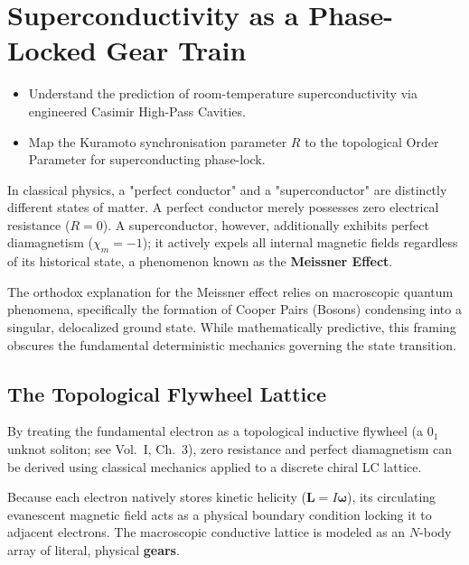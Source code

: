 \section{Superconductivity as a Phase-Locked Gear Train}


\begin{objectivebox}
\begin{itemize}
    \item Understand the prediction of room-temperature superconductivity via engineered Casimir High-Pass Cavities.
    \item Map the Kuramoto synchronisation parameter $R$ to the topological Order Parameter for superconducting phase-lock.
\end{itemize}
\end{objectivebox}

In classical physics, a "perfect conductor" and a "superconductor" are distinctly different states of matter. A perfect conductor merely possesses zero electrical resistance ($R=0$). A superconductor, however, additionally exhibits perfect diamagnetism ($\chi_m = -1$); it actively expels all internal magnetic fields regardless of its historical state, a phenomenon known as the \textbf{Meissner Effect}.

The orthodox explanation for the Meissner effect relies on macroscopic quantum phenomena, specifically the formation of Cooper Pairs (Bosons) condensing into a singular, delocalized ground state. While mathematically predictive, this framing obscures the fundamental deterministic mechanics governing the state transition. 

\subsection{The Topological Flywheel Lattice}
By treating the fundamental electron as a topological inductive flywheel (a $0_1$ unknot soliton; see Vol.~I, Ch.~3), zero resistance and perfect diamagnetism can be derived using classical mechanics applied to a discrete chiral LC lattice.

Because each electron natively stores kinetic helicity ($\mathbf{L} = I\boldsymbol{\omega}$), its circulating evanescent magnetic field acts as a physical boundary condition locking it to adjacent electrons. The macroscopic conductive lattice is modeled as an $N$-body array of literal, physical \textbf{gears}.

